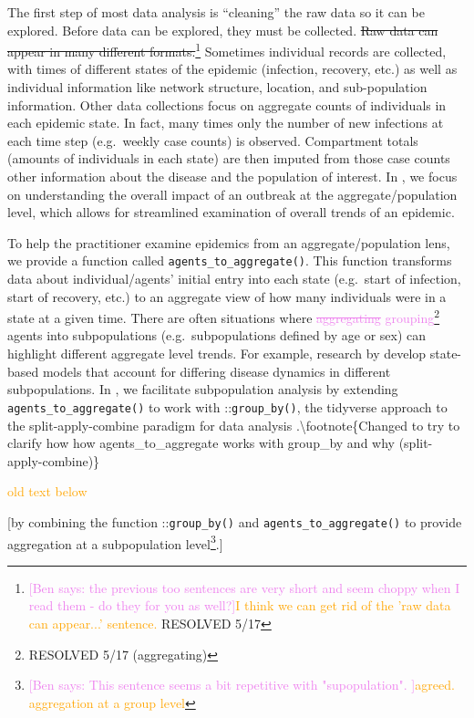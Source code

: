 \documentclass[
  shortnames]{jss}
\begin{document}
The first step of most data analysis is ``cleaning'' the raw data so it
can be explored. Before data can be explored, they must be collected.
\sout{Raw data can appear in many different formats.}\footnote{\textcolor{violet}{[Ben says: the previous too sentences are very short and seem choppy when I read them - do they for you as well?]}\textcolor{orange}{I think we can get rid of the 'raw data can appear...' sentence.} RESOLVED 5/17}
Sometimes individual records are collected, with times of different
states of the epidemic (infection, recovery, etc.) as well as individual
information like network structure, location, and sub-population
information. Other data collections focus on aggregate counts of
individuals in each epidemic state. In fact, many times only the number
of new infections at each time step (e.g.~weekly case counts) is
observed. Compartment totals (amounts of individuals in each state) are
then imputed from those case counts other information about the disease
and the population of interest. In , we focus on
understanding the overall impact of an outbreak at the
aggregate/population level, which allows for streamlined examination of
overall trends of an epidemic.

To help the practitioner examine epidemics from an aggregate/population
lens, we provide a function called \texttt{agents\_to\_aggregate()}.
This function transforms data about individual/agents' initial entry
into each state (e.g.~start of infection, start of recovery, etc.) to an
aggregate view of how many individuals were in a state at a given time.
There are often situations where
\textcolor{violet}{\sout{aggregating} grouping}\footnote{RESOLVED 5/17 (aggregating)}
agents into subpopulations (e.g.~subpopulations defined by age or sex)
can highlight different aggregate level trends. For example, research by
\citet{rvachev1985,anderson1992,worby2015} develop state-based models
that account for differing disease dynamics in different subpopulations.
In , we facilitate subpopulation analysis by extending
\texttt{agents\_to\_aggregate()} to work with
::\texttt{group\_by()}, the tidyverse approach to the
split-apply-combine paradigm for data analysis
\citep{wickham2011}.\textbackslash footnote\{Changed to try to clarify
how how agents\_to\_aggregate works with group\_by and why
(split-apply-combine)\}

\textcolor{orange}{old text below}

{[}by combining the function ::\texttt{group\_by()} and
\texttt{agents\_to\_aggregate()} to provide aggregation at a
subpopulation
level\footnote{\textcolor{violet}{[Ben says: This sentence seems a bit repetitive with "supopulation". ]}\textcolor{orange}{agreed. aggregation at a group level}}.{]}
\end{document}
